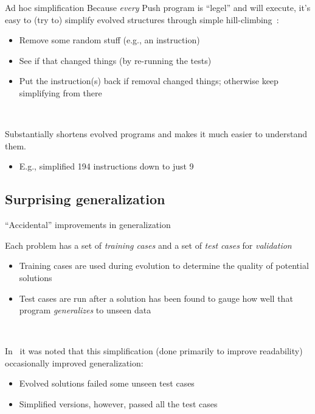 \documentclass{beamer}
\begin{document}
\begin{frame}{Ad hoc simplification}
Because \emph{every} Push program is ``legel'' and will execute, it's easy to (try to) simplify evolved structures through simple hill-climbing~\cite{Spector:2014:GECCOcomp}:
\begin{itemize}
	\item Remove some random stuff (e.g., an instruction)
	\item See if that changed things (by re-running the tests)
	\item Put the instruction(s) back if removal changed things; otherwise keep simplifying from there
\end{itemize}
 
 ~
 
 Substantially shortens evolved programs and makes it much easier to
 understand them.
 \begin{itemize}
 	\item E.g., simplified 194 instructions down to just 9
 \end{itemize}
\end{frame}

\subsection{Surprising generalization}

\begin{frame}{``Accidental'' improvements in generalization}

Each problem has a set of \emph{training cases} and a set of \emph{test cases} for \emph{validation}~\cite{Helmuth:2015:GECCO}
\begin{itemize}
	\item Training cases are used during evolution to determine the quality of potential solutions
	\item Test cases are run after a solution has been found to gauge how well that program \emph{generalizes} to unseen data
\end{itemize}

~

In~\cite{Helmuth:2015:dissertation} it was noted that this simplification (done primarily to improve readability) occasionally improved generalization:
\begin{itemize}
	\item Evolved solutions failed some unseen test cases
	\item Simplified versions, however, passed all the test cases
\end{itemize}


\end{frame}
\end{document}
